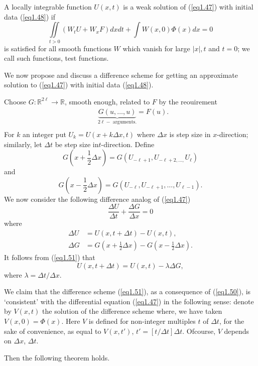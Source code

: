 \begin{defi*}
A locally integrable function $U(x,t)$ is a weak solution of (\ref{eq1.47}) with initial data (\ref{eq1.48}) if 
\begin{equation*}
\iint\limits_{t > 0} (W_t U + W_x F) dx dt + \int W (x,0) \Phi (x) dx = 0
\tag{1.49}\label{eq1.49}
\end{equation*}
is satisfied for all smooth functions $W$ which vanish for large $|x|, t$ and $t=0$; we call such functions, test functions. 

We now propose and discuss a difference scheme for getting an approximate solution to (\ref{eq1.47}) with initial data (\ref{eq1.48}).

Choose $G:\mathbb{R}^{2\ell} \to \mathbb{R}$, smooth enough, related to $F$ by the reouirement
\begin{align*}
& \underbrace{G(u, \ldots, u)}_{2\ell - \text{ arguments.}} = F (u). 
\tag{1.50}\label{eq1.50}\\
\end{align*}
For $k$ an integer put $U_k = U (x+ k \Delta x, t)$ where $\Delta x$ is step size in $x$-direction; similarly, let $\Delta t$ be step size in\pageoriginale $t$-direction. Define
$$
G(x + \frac{1}{2} \Delta x)= G(U_{-\ell + 1}, U_{-\ell + 2, \ldots , } U_\ell)
$$
and
$$
G(x-\frac{1}{2} \Delta x) = G(U_{-\ell}, U_{-\ell + 1}, \ldots , U_{\ell -1}). 
$$
We now consider the following difference analog of (\ref{eq1.47})
\begin{equation*}
\frac{\Delta U}{\Delta t} + \frac{\Delta G}{\Delta x} = 0
\tag{1.51}\label{eq1.51}
\end{equation*}
where 
\begin{align*}
\Delta U & = U (x, t + \Delta t) - U (x,t),\\
\Delta G & = G (x + \frac{1}{2} \Delta x) - G(x - \frac{1}{2}\Delta x). 
\end{align*}
It follows from (\ref{eq1.51}) that 
\begin{equation*}
U(x,t + \Delta t) = U (x,t) - \lambda \Delta G, 
\tag*{$(1.51)'$}\label{eq1.51'}
\end{equation*}
where $\lambda = \Delta t / \Delta x$.

We claim that the difference scheme (\ref{eq1.51}), as a consequence of (\ref{eq1.50}), is `consistent' with the differential equation (\ref{eq1.47}) in the following sense: denote by $V(x,t)$ the solution of the difference scheme where, we have taken $V(x,0) = \Phi (x)$. Here $V$ is defined for non-integer multiples $t$ of $\Delta t$, for the sake of convenience, as equal to $V(x,t')$, $t' = [t /\Delta t ] \Delta t$. Ofcourse, $V$ depends on $\Delta x$, $\Delta t$. 

Then the following theorem holds.
\end{defi*}

